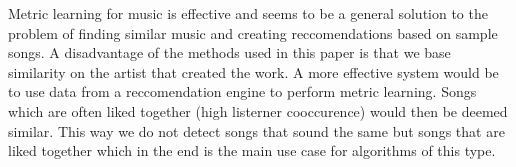 \documentclass[a4paper,10pt]{article}
\begin{document}
Metric learning for music is effective and seems to be a general solution to the problem of finding similar music and creating reccomendations based on sample songs. A disadvantage of the methods used in this paper is that we base similarity on the artist that created the work. A more effective system would be to use data from a reccomendation engine to perform metric learning. Songs which are often liked together (high listerner cooccurence) would then be deemed similar. This way we do not detect songs that sound the same but songs that are liked together which in the end is the main use case for algorithms of this type. 
{}
\end{document}
